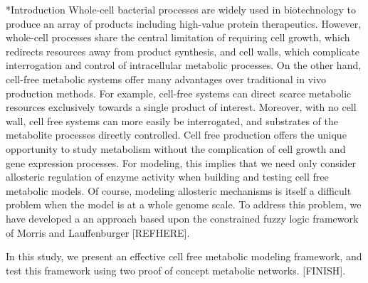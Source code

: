 \documentclass[12pt]{article}
\makeatletter
\renewcommand\section{\@startsection
	{subsection}{2}{0mm}
	{-0.2in}
	{0.05\baselineskip}
	{\normalfont\large\bfseries}}
\makeatother
\begin{document}
\section*{Introduction}
Whole-cell bacterial processes are widely used in biotechnology to produce an array of products including high-value protein therapeutics.
However, whole-cell processes share the central limitation of requiring cell growth, 
which redirects resources away from product synthesis, and cell walls, which complicate interrogation and control of intracellular metabolic processes.
On the other hand, cell-free metabolic systems offer many advantages over traditional in vivo production methods. 
For example, cell-free systems can direct scarce metabolic resources exclusively towards a single product of interest. 
Moreover, with no cell wall, cell free systems can more easily be interrogated, and substrates of the metabolite processes directly controlled.
Cell free production offers the unique opportunity to study metabolism without the complication of cell growth and gene expression processes.
For modeling, this implies that we need only consider allosteric regulation of enzyme activity when building and testing cell free metabolic models.
Of course, modeling allosteric mechanisms is itself a difficult problem when the model is at a whole genome scale. To address this problem, we have developed a
an approach based upon the constrained fuzzy logic framework of Morris and Lauffenburger [REFHERE].

In this study, we present an effective cell free metabolic modeling framework, and test this framework using two proof of concept metabolic networks. 
[FINISH].

\clearpage
\end{document}
